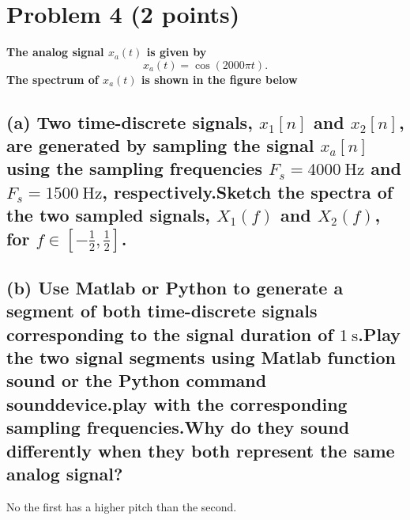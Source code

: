 \section{Problem 4 (2 points)}
\textbf{The analog signal $ x_{a}(t) $ is given by\[x_{a}(t)=\cos (2000 \pi t) .\]The spectrum of $ x_{a}(t) $ is shown in the figure below}


\subsection*{(a) Two time-discrete signals, $ x_{1}[n] $ and $ x_{2}[n] $, are generated by sampling the signal $ x_{a}[n] $ using the sampling frequencies $ F_{s}=4000 \mathrm{~Hz} $ and $ F_{s}=1500 \mathrm{~Hz} $, respectively.Sketch the spectra of the two sampled signals, $ X_{1}(f) $ and $ X_{2}(f) $, for $ f \in\left[-\frac{1}{2}, \frac{1}{2}\right] $.}




\subsection*{(b) Use Matlab or Python to generate a segment of both time-discrete signals corresponding to the signal duration of $ 1 \mathrm{~s} $.Play the two signal segments using Matlab function sound or the Python command sounddevice.play with the corresponding sampling frequencies.Why do they sound differently when they both represent the same analog signal?}

No the first has a higher pitch than the second.